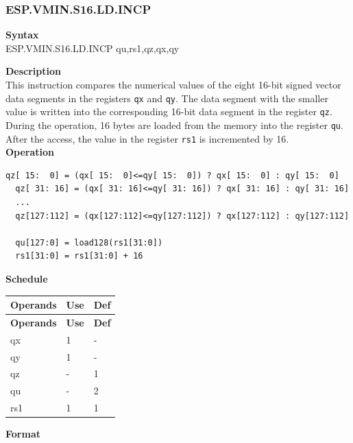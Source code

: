 \newpage
\subsubsection{ESP.VMIN.S16.LD.INCP}\label{instruction:ESPVMINS16LDINCP}
\textbf{Syntax}\\
ESP.VMIN.S16.LD.INCP qu,rs1,qz,qx,qy

\textbf{Description}\\
This instruction compares the numerical values of the eight 16-bit signed vector data segments in the registers \lstinline{qx} and \lstinline{qy}. The data segment with the smaller value is written into the corresponding 16-bit data segment in the register \lstinline{qz}.\\During the operation, 16 bytes are loaded from the memory into the register \lstinline{qu}. After the access, the value in the register \lstinline{rs1} is incremented by 16.\\
\textbf{Operation}
\begin{lstlisting}[escapeinside=`?]
  qz[ 15:  0] = (qx[ 15:  0]<=qy[ 15:  0]) ? qx[ 15:  0] : qy[ 15:  0]
  qz[ 31: 16] = (qx[ 31: 16]<=qy[ 31: 16]) ? qx[ 31: 16] : qy[ 31: 16]
  ...
  qz[127:112] = (qx[127:112]<=qy[127:112]) ? qx[127:112] : qy[127:112]

  qu[127:0] = load128(rs1[31:0])
  rs1[31:0] = rs1[31:0] + 16
\end{lstlisting}


\textbf{Schedule}\\
\begin{longtable}[c]{|l|l|l|}
    \hline
    \rowcolor{lightgray}
    \textbf{Operands} & \textbf{Use} & \textbf{Def} \\\hline
    \endfirsthead
    \hline
    \rowcolor{lightgray}
     \textbf{Operands} & \textbf{Use} & \textbf{Def} \\\hline
    \endhead
    \hline
    \endfoot

    qx & 1 & - \\\hline
  qy & 1 & - \\\hline
     qz & - & 1 \\\hline
     qu & - & 2 \\\hline
     rs1 & 1 & 1

\end{longtable}

\textbf{Format}\\

